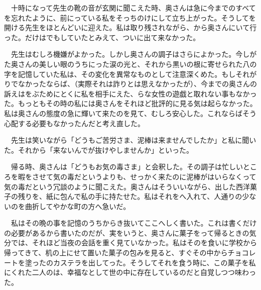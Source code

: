 \documentclass[a4j,onecolumn]{tarticle}
\begin{document}
　十時になって先生の靴の音が玄関に聞こえた時、\hbox{}奥さんは急に今までのすべてを忘れたように、\hbox{}前にっている私をそっちのけにして立ち上がった。\hbox{}そうしてを開ける先生をほとんどいに迎えた。\hbox{}私は取り残されながら、\hbox{}から奥さんにいて行った。\hbox{}だけはでもしていたとみえて、\hbox{}ついに出て来なかった。\hbox{}\par{}
　先生はむしろ機嫌がよかった。\hbox{}しかし奥さんの調子はさらによかった。\hbox{}今しがた奥さんの美しい眼のうちにった涙の光と、\hbox{}それから黒いの根に寄せられた八の字を記憶していた私は、\hbox{}その変化を異常なものとして注意深くめた。\hbox{}もしそれがりでなかったならば、\hbox{}（実際それは詐りとは思えなかったが）、\hbox{}今までの奥さんの訴えはをぶためにとくに私を相手にえた、\hbox{}らな女性の遊戯と取れない事もなかった。\hbox{}もっともその時の私には奥さんをそれほど批評的に見る気は起らなかった。\hbox{}私は奥さんの態度の急に輝いて来たのを見て、\hbox{}むしろ安心した。\hbox{}これならばそう心配する必要もなかったんだと考え直した。\hbox{}\par{}
　先生は笑いながら「どうもご苦労さま、\hbox{}泥棒は来ませんでしたか」と私に聞いた。\hbox{}それから「来ないんでが抜けやしませんか」といった。\hbox{}\par{}
　帰る時、\hbox{}奥さんは「どうもお気の毒さま」と会釈した。\hbox{}その調子は忙しいところを暇をさせて気の毒だというよりも、\hbox{}せっかく来たのに泥棒がはいらなくって気の毒だという冗談のように聞こえた。\hbox{}奥さんはそういいながら、\hbox{}出した西洋菓子の残りを、\hbox{}紙に包んで私の手に持たせた。\hbox{}私はそれをへ入れて、\hbox{}人通りの少ないのを曲折してやかな町の方へ急いだ。\hbox{}\par{}
　私はその晩の事を記憶のうちからき抜いてここへしく書いた。\hbox{}これは書くだけの必要があるから書いたのだが、\hbox{}実をいうと、\hbox{}奥さんに菓子をって帰るときの気分では、\hbox{}それほど当夜の会話を重く見ていなかった。\hbox{}私はそのを食いに学校から帰ってきて、\hbox{}机の上にせて置いた菓子の包みを見ると、\hbox{}すぐその中からチョコレートを塗ったのカステラを出してった。\hbox{}そうしてそれを食う時に、\hbox{}この菓子を私にくれた二人のは、\hbox{}幸福なとして世の中に存在しているのだと自覚しつつ味わった。\hbox{}\par{}
\end{document}
